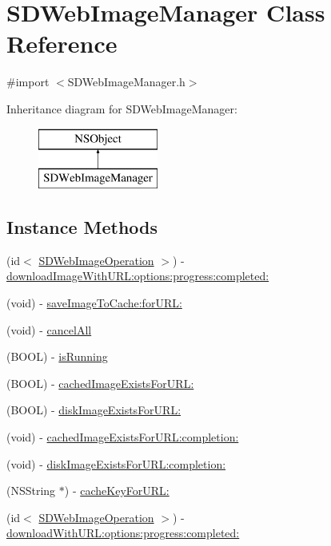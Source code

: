 \hypertarget{interface_s_d_web_image_manager}{}\section{S\+D\+Web\+Image\+Manager Class Reference}
\label{interface_s_d_web_image_manager}


{\ttfamily \#import $<$S\+D\+Web\+Image\+Manager.\+h$>$}

Inheritance diagram for S\+D\+Web\+Image\+Manager\+:\begin{figure}[H]
\begin{center}
\leavevmode
\includegraphics[height=2.000000cm]{interface_s_d_web_image_manager}
\end{center}
\end{figure}
\subsection*{Instance Methods}
\begin{DoxyCompactItemize}
\item 
(id$<$ \hyperlink{protocol_s_d_web_image_operation-p}{S\+D\+Web\+Image\+Operation} $>$) -\/ \hyperlink{interface_s_d_web_image_manager_a100c85fc75fec03c8a57671ad7860ae8}{download\+Image\+With\+U\+R\+L\+:options\+:progress\+:completed\+:}
\item 
(void) -\/ \hyperlink{interface_s_d_web_image_manager_aef49604cf549a4ef33012b630be9b6cd}{save\+Image\+To\+Cache\+:for\+U\+R\+L\+:}
\item 
(void) -\/ \hyperlink{interface_s_d_web_image_manager_a8cd0959562d0120f6a1976b8f9d49b7b}{cancel\+All}
\item 
(B\+O\+O\+L) -\/ \hyperlink{interface_s_d_web_image_manager_afc97641bfb1b30b1a262462a12c56c46}{is\+Running}
\item 
(B\+O\+O\+L) -\/ \hyperlink{interface_s_d_web_image_manager_a9634c36e65314e0b973056a96f6a62e2}{cached\+Image\+Exists\+For\+U\+R\+L\+:}
\item 
(B\+O\+O\+L) -\/ \hyperlink{interface_s_d_web_image_manager_a7ed53c304da787466f777c636447e6d0}{disk\+Image\+Exists\+For\+U\+R\+L\+:}
\item 
(void) -\/ \hyperlink{interface_s_d_web_image_manager_aa72af601cfd30dd294599f2f3df28521}{cached\+Image\+Exists\+For\+U\+R\+L\+:completion\+:}
\item 
(void) -\/ \hyperlink{interface_s_d_web_image_manager_a1456e7eba9775bab99b263c49ffa04fd}{disk\+Image\+Exists\+For\+U\+R\+L\+:completion\+:}
\item 
(N\+S\+String $\ast$) -\/ \hyperlink{interface_s_d_web_image_manager_a6f02c3f166329cdc53553621a7f8c04a}{cache\+Key\+For\+U\+R\+L\+:}
\item 
(id$<$ \hyperlink{protocol_s_d_web_image_operation-p}{S\+D\+Web\+Image\+Operation} $>$) -\/ \hyperlink{interface_s_d_web_image_manager_a76672529aa9425cbdf50d79528040942}{download\+With\+U\+R\+L\+:options\+:progress\+:completed\+:}
\end{DoxyCompactItemize}
